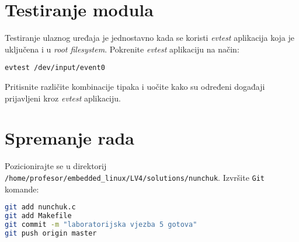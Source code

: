 \documentclass[11pt]{article}
\begin{document}
\section{Testiranje modula}
Testiranje ulaznog uređaja je jednostavno kada se koristi \textit{evtest}
aplikacija koja je uključena i u \textit{root filesystem}.
Pokrenite \textit{evtest} aplikaciju na način:
\begin{lstlisting}
evtest /dev/input/event0
\end{lstlisting}
Pritisnite različite kombinacije tipaka i uočite kako su određeni događaji
prijavljeni kroz \textit{evtest} aplikaciju.

\section{Spremanje rada}
Pozicionirajte se u direktorij \texttt{/home/profesor/embedded\_linux/LV4/solutions/nunchuk}.
Izvršite \texttt{Git} komande:
\begin{lstlisting}[language=bash]
git add nunchuk.c
git add Makefile
git commit -m "laboratorijska vjezba 5 gotova"
git push origin master
\end{lstlisting}
\end{document}
